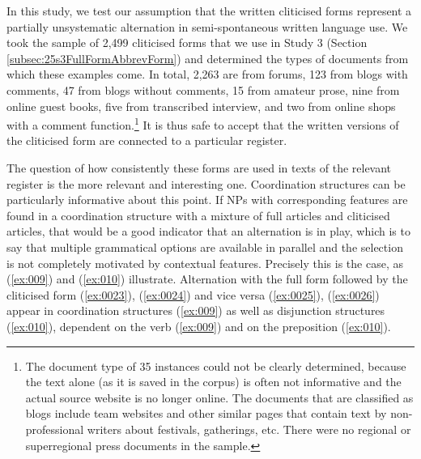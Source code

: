 In this study, we test our assumption that the written cliticised forms represent a partially unsystematic alternation in semi-spontaneous written language use.
We took the sample of 2,499 cliticised forms that we use in Study 3 (Section \ref{subsec:25s3FullFormAbbrevForm}) and determined the types of documents from which these examples come.
In total, 2,263 are from forums, 123 from blogs with comments, 47 from blogs without comments, 15 from amateur prose, nine from online guest books, five from transcribed interview, and two from online shops with a comment function.\footnote{
	The document type of 35 instances could not be clearly determined, because the text alone (as it is saved in the corpus) is often not informative and the actual source website is no longer online.
	The documents that are classified as blogs include team websites and other similar pages that contain text by non-professional writers about festivals, gatherings, etc.
	There were no regional or superregional press documents in the sample.}
It is thus safe to accept that the written versions of the cliticised form are connected to a particular register.

The question of how consistently these forms are used in texts of the relevant register is the more relevant and interesting one.
Coordination structures can be particularly informative about this point.
If NPs with corresponding features are found in a coordination structure with a mixture of full articles and cliticised articles, that would be a good indicator that an alternation is in play, which is to say that multiple grammatical options are available in parallel and the selection is not completely motivated by contextual features.
Precisely this is the case, as (\ref{ex:009}) and (\ref{ex:010}) illustrate.
Alternation with the full form followed by the cliticised form (\ref{ex:0023}), (\ref{ex:0024}) and vice versa (\ref{ex:0025}), (\ref{ex:0026}) appear in coordination structures (\ref{ex:009}) as well as disjunction structures (\ref{ex:010}), dependent on the verb (\ref{ex:009}) and on the preposition (\ref{ex:010}).

